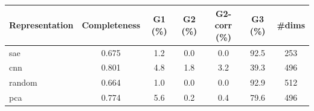 \begin{tabular}{lcccccc}
\toprule
Representation & Completeness & G1 (\%) & G2 (\%) & G2-corr (\%) & G3 (\%) & \#dims \\
\midrule
sae & 0.675 & 1.2 & 0.0 & 0.0 & 92.5 & 253 \\
cnn & 0.801 & 4.8 & 1.8 & 3.2 & 39.3 & 496 \\
random & 0.664 & 1.0 & 0.0 & 0.0 & 92.9 & 512 \\
pca & 0.774 & 5.6 & 0.2 & 0.4 & 79.6 & 496 \\
\bottomrule
\end{tabular}
